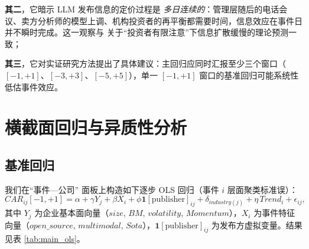 \documentclass[11pt]{ctexart}
\begin{document}
\textbf{其二}，它暗示 LLM 发布信息的定价过程是 \emph{多日连续的}：管理层随后的电话会议、卖方分析师的模型上调、机构投资者的再平衡都需要时间，信息效应在事件日并不瞬时完成。这一观察与 \cite{HirshleiferTeoh2003} 关于“投资者有限注意”下信息扩散缓慢的理论预测一致；

\textbf{其三}，它对实证研究方法提出了具体建议：主回归应同时汇报至少三个窗口（$[-1,+1]$、$[-3,+3]$、$[-5,+5]$），单一 $[-1,+1]$ 窗口的基准回归可能系统性低估事件效应。

\section{横截面回归与异质性分析}
\label{sec:cross}

\subsection{基准回归}

我们在“事件—公司” 面板上构造如下逐步 OLS 回归（事件 $i$ 层面聚类标准误）：
\begin{equation}
CAR_{ij}[-1,+1] = \alpha + \gamma Y_j + \beta X_i + \phi \mathbf{1}[\text{publisher}]_{ij} + \delta_{industry(j)} + \eta\, Trend_i + \epsilon_{ij},
\label{eq:main}
\end{equation}
其中 $Y_j$ 为企业基本面向量（$size$, $BM$, $volatility$, $Momentum$），$X_i$ 为事件特征向量（$open\_source$, $multimodal$, $Sota$），$\mathbf{1}[\text{publisher}]_{ij}$ 为发布方虚拟变量。结果见表 \ref{tab:main_ols}。
\end{document}
